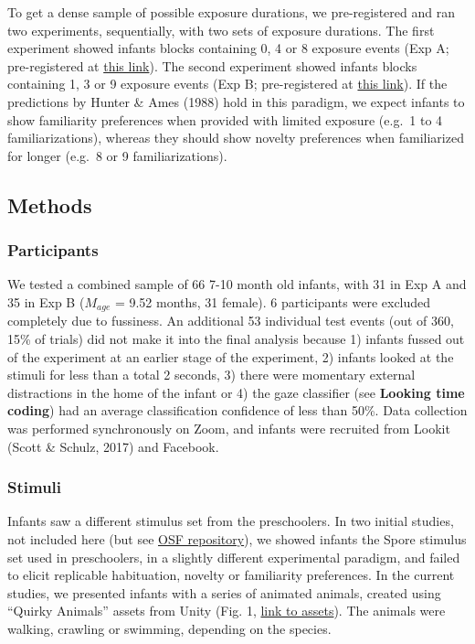 \documentclass[10pt, letterpaper]{article}
\begin{document}
To get a dense sample of possible exposure durations, we pre-registered
and ran two experiments, sequentially, with two sets of exposure
durations. The first experiment showed infants blocks containing 0, 4 or
8 exposure events (Exp A; pre-registered at
\href{https://osf.io/gux4f/?view_only=b4d6d0118dfa41a79fb431d389f4fecc}{this
link}). The second experiment showed infants blocks containing 1, 3 or 9
exposure events (Exp B; pre-registered at
\href{https://osf.io/w6pgu/?view_only=39ee108159884761a0c5bc68d11918df}{this
link}). If the predictions by Hunter \& Ames (1988) hold in this
paradigm, we expect infants to show familiarity preferences when
provided with limited exposure (e.g.~1 to 4 familiarizations), whereas
they should show novelty preferences when familiarized for longer
(e.g.~8 or 9 familiarizations).

\hypertarget{methods-1}{%
\subsection{Methods}\label{methods-1}}

\hypertarget{participants-1}{%
\subsubsection{Participants}\label{participants-1}}

We tested a combined sample of 66 7-10 month old infants, with 31 in Exp
A and 35 in Exp B (\(M_{age}\) = 9.52 months, 31 female). 6 participants
were excluded completely due to fussiness. An additional 53 individual
test events (out of 360, 15\% of trials) did not make it into the final
analysis because 1) infants fussed out of the experiment at an earlier
stage of the experiment, 2) infants looked at the stimuli for less than
a total 2 seconds, 3) there were momentary external distractions in the
home of the infant or 4) the gaze classifier (see \textbf{Looking time
coding}) had an average classification confidence of less than 50\%.
Data collection was performed synchronously on Zoom, and infants were
recruited from Lookit (Scott \& Schulz, 2017) and Facebook.

\hypertarget{stimuli-1}{%
\subsubsection{Stimuli}\label{stimuli-1}}

Infants saw a different stimulus set from the preschoolers. In two
initial studies, not included here (but see
\href{https://osf.io/b3xsk/?view_only=5beeb6ed27874ae3bfe586ee2b38381a}{OSF
repository}), we showed infants the Spore stimulus set used in
preschoolers, in a slightly different experimental paradigm, and failed
to elicit replicable habituation, novelty or familiarity preferences. In
the current studies, we presented infants with a series of animated
animals, created using ``Quirky Animals'' assets from Unity (Fig. 1,
\href{https://tinyurl.com/469xxrn7}{link to assets}). The animals were
walking, crawling or swimming, depending on the species.
\end{document}
